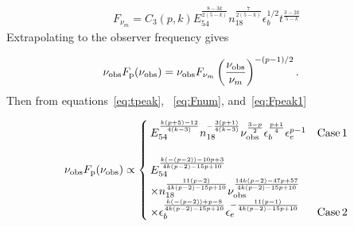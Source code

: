 \documentclass[usenatbib,fleqn]{mnras}
\begin{document}
\begin{align}
  F_{\nu_m} =  C_3(p, k) E_{54}^{\frac{8-3 k}{2 (5-k)}}
  n_{18}^{\frac{7}{2 (5-k)}} \epsilon_b^{1/2} t^{\frac{3-2 k}{5-k}}
\label{eq:Fnum}
\end{align}
%
Extrapolating to the observer frequency gives 

\begin{align}
  \nu_{\rm obs} F_{\rm p} (\nu_{\rm obs}) &= \nu_{\rm obs}   F_{\nu_m}
  \left(\frac{\nu_{\rm obs}}{\nu_m}\right)^{-(p-1)/2}.
  \label{eq:Fpeak1}
\end{align}
%
Then from equations~\eqref{eq:tpeak}, ~\eqref{eq:Fnum},
and~\eqref{eq:Fpeak1}

\begin{align}
  \nu_{\rm obs} F_{\rm p} (\nu_{\rm obs}) \propto
  \begin{cases}
    E_{54}^{\frac{k (p+5)-12}{4 (k-3)}} n_{18}^{-\frac{3 (p+1)}{4
        (k-3)}} \nu_{\rm obs}^{\frac{3-p}{2}}
    \epsilon_b^{\frac{p+1}{4}} \epsilon_e^{p-1} & {\rm Case \,
      1}\\\\
    E_{54}^{\frac{k(-(p-2))-10 p+3}{4 k (p-2)-15 p+10}} \\ \times
    n_{18}^{\frac{11 (p-2)}{4 k (p-2)-15 p+10}} \nu_{\rm
      obs}^{\frac{14 k (p-2)-47 p+57}{4 k (p-2)-15 p+10}} \\ \times
    \epsilon_b^{\frac{k (-(p-2))+p-8}{4 k(p-2)-15 p+10}}
    \epsilon_e^{-\frac{11 (p-1)}{4 k (p-2)-15p+10}} & {\rm Case \, 2}
  \end{cases}
  \label{eq:peakLumGen}
\end{align}




\clearpage
  \footnotesize{
    
    
  }
\end{document}
